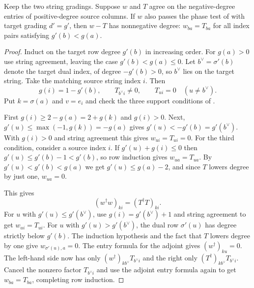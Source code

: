 \begin{lemma}
\label{lem:a-bessel-surviving-chord-class}
\emitthmsource
Keep the two string gradings. Suppose $w$ and $T$ agree on the negative-degree entries of positive-degree source columns. If $w$ also passes the phase test of  with target grading $d'=g'$, then $w-T$ has nonnegative degree: $w_{ba}=T_{ba}$ for all index pairs satisfying $g'(b)<g(a)$.
\end{lemma}
\begin{proof}
Induct on the target row degree $g'(b)$ in increasing order. For $g(a)>0$ use string agreement, leaving the case $g'(b)<g(a)\le0$. Let $b^\vee=\sigma'(b)$ denote the target dual index, of degree $-g'(b)>0$, so $b^\vee$ lies on the target string. Take the matching source string index $i$. Then
\[
 g(i)=1-g'(b),\qquad T_{b^\vee i}\ne0,\qquad
       T_{u i}=0\quad(u\ne b^\vee).
\]
Put $k=\sigma(a)$ and $v=e_i$ and check the three support conditions of .

First $g(i)\ge2-g(a)=2+g(k)$ and $g(i)>0$. Next, $g'(u)\le\max(-1,g(k))=-g(a)$ gives $g'(u)<-g'(b)=g'(b^\vee)$. With $g(i)>0$ and string agreement this gives $w_{ui}=T_{ui}=0$. For the third condition, consider a source index $i$. If $g'(u)+g(i)\le0$ then $g'(u)\le g'(b)-1<g'(b)$, so row induction gives $w_{ua}=T_{ua}$. By $g'(u)<g'(b)<g(a)$ we get $g'(u)\le g(a)-2$, and since $T$ lowers degree by just one, $w_{ua}=0$.

This gives
\[
 (w^\dagger w)_{ki}=(T^\dagger T)_{ki}.
\]
For $u$ with $g'(u)\le g'(b^\vee)$, use $g(i)=g'(b^\vee)+1$ and string agreement to get $w_{ui}=T_{ui}$. For $u$ with $g'(u)>g'(b^\vee)$, the dual row $\sigma'(u)$ has degree strictly below $g'(b)$. The induction hypothesis and the fact that $T$ lowers degree by one give $w_{\sigma'(u),a}=0$. The entry formula for the adjoint gives $(w^\dagger)_{k u}=0$. The left-hand side now has only $(w^\dagger)_{k b^\vee}T_{b^\vee i}$ and the right only $(T^\dagger)_{k b^\vee}T_{b^\vee i}$. Cancel the nonzero factor $T_{b^\vee i}$ and use the adjoint entry formula again to get $w_{ba}=T_{ba}$, completing row induction.
\end{proof}

